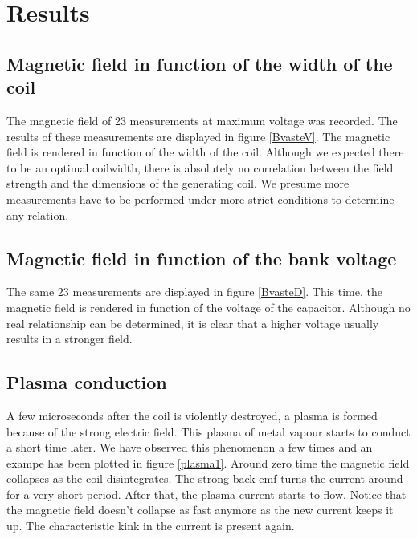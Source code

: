 \section{Results}

\subsection{Magnetic field in function of the width of the coil}

The magnetic field of 23 measurements at maximum voltage was recorded. The 
results of these measurements are displayed in figure \ref{BvasteV}. The 
magnetic field is rendered in function of the width of the coil. Although we 
expected there to be an optimal coilwidth, there is absolutely no correlation 
between the field strength and the dimensions of the generating coil. We 
presume more measurements have to be performed under more strict conditions to 
determine any relation.


\subsection{Magnetic field in function of the bank voltage}

The same 23 measurements are displayed in figure \ref{BvasteD}. This time, the 
magnetic field is rendered in function of the voltage of the capacitor.  
Although no real relationship can be determined, it is clear that a higher 
voltage usually results in a stronger field.


\subsection{Plasma conduction}

A few microseconds after the coil is violently destroyed, a plasma is formed 
because of the strong electric field. This plasma of metal vapour starts to 
conduct a short time later. We have observed this phenomenon a few times and an 
exampe has been plotted in figure \ref{plasma1}. Around zero time the magnetic 
field collapses as the coil disintegrates. The strong back emf turns the 
current around for a very short period. After that, the plasma current starts 
to flow. Notice that the magnetic field doesn't collapse as fast anymore as the 
new current keeps it up. The characteristic kink in the current is present 
again.

